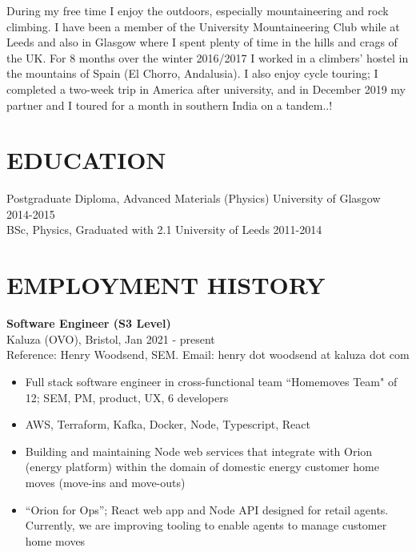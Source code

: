 \documentclass[overlap, line, 10pt]{res} %
\begin{document}
\begin{resume}
During my free time I enjoy the outdoors, especially mountaineering and rock climbing. I have been a member of the University Mountaineering Club while at Leeds and also in Glasgow where I spent plenty of time in the hills and crags of the UK.
For 8 months over the winter 2016/2017 I worked in a climbers' hostel in the mountains of Spain (El Chorro, Andalusia). I also enjoy cycle touring; I completed a two-week trip in America after university, and in December 2019 my partner and I toured for a month in southern India on a tandem..!

\section{EDUCATION}

Postgraduate Diploma, Advanced Materials (Physics) University of Glasgow 2014-2015\\
BSc, Physics, Graduated with 2.1 University of Leeds 2011-2014

\pagebreak

\section{EMPLOYMENT HISTORY}

\textbf{Software Engineer (S3 Level)}\\
Kaluza (OVO), Bristol, Jan 2021 - present \\
Reference: Henry Woodsend, SEM. Email: henry dot woodsend at kaluza dot com  \\
\begin{itemize} \itemsep -1pt
\item Full stack software engineer in cross-functional team ``Homemoves Team" of 12; SEM, PM, product, UX, 6 developers
\item AWS, Terraform, Kafka, Docker, Node, Typescript, React
\item Building and maintaining Node web services that integrate with Orion (energy platform) within the domain of domestic energy customer home moves (move-ins and move-outs)
\item ``Orion for Ops''; React web app and Node API designed for retail agents. Currently, we are improving tooling to enable agents to manage customer home moves
\end{itemize}


\end{resume}
\end{document}
